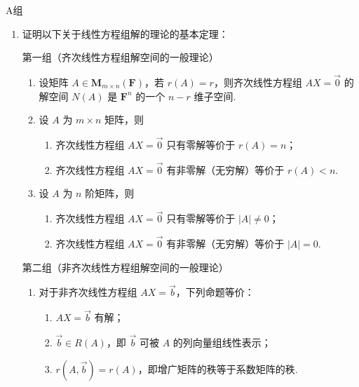 \centerline{\heiti A组}
\begin{enumerate}
    \item 证明以下关于线性方程组解的理论的基本定理：

          第一组（齐次线性方程组解空间的一般理论）
          \begin{enumerate}
              \item 设矩阵 $A \in \mathbf{M}_{m\times n}(\mathbf{F})$，若 $r(A)=r$，则齐次线性方程组 $AX=\vec{0}$ 的解空间 $N(A)$ 是 $\mathbf{F}^n$ 的一个 $n-r$ 维子空间.

              \item 设 $A$ 为 $m \times n$ 矩阵，则
                    \begin{enumerate}
                        \item 齐次线性方程组 $AX=\vec{0}$ 只有零解等价于 $r(A)=n$；

                        \item 齐次线性方程组 $AX=\vec{0}$ 有非零解（无穷解）等价于 $r(A)<n$.
                    \end{enumerate}

              \item 设 $A$ 为 $n$ 阶矩阵，则
                    \begin{enumerate}
                        \item 齐次线性方程组 $AX=\vec{0}$ 只有零解等价于 $|A|\neq 0$；

                        \item 齐次线性方程组 $AX=\vec{0}$ 有非零解（无穷解）等价于 $|A|=0$.
                    \end{enumerate}
          \end{enumerate}

          第二组（非齐次线性方程组解空间的一般理论）
          \begin{enumerate}[resume*]
              \item 对于非齐次线性方程组 $AX=\vec{b}$，下列命题等价：
                    \begin{enumerate}
                        \item $AX=\vec{b}$ 有解；

                        \item $\vec{b} \in R(A)$，即 $\vec{b}$ 可被 $A$ 的列向量组线性表示；

                        \item $r(A,\vec{b})=r(A)$，即增广矩阵的秩等于系数矩阵的秩.
                    \end{enumerate}
          \end{enumerate}


\end{enumerate}
